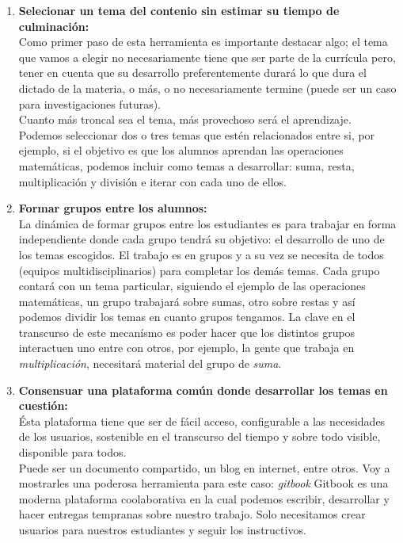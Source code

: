 \begin{enumerate}
 \item \textbf{Selecionar un tema del contenio sin estimar su tiempo de culminaci\'on:}\\
 Como primer paso de esta herramienta es importante destacar algo; el tema que vamos a elegir no necesariamente tiene que ser parte de la curr\'icula pero, tener 
 en cuenta que su desarrollo preferentemente durar\'a lo que dura el dictado de la materia, o m\'as, o no necesariamente termine (puede ser un caso para 
 investigaciones futuras).\\
 Cuanto m\'as troncal sea el tema, m\'as provechoso ser\'a el aprendizaje.\\ 
 Podemos seleccionar dos o tres temas que est\'en relacionados entre si, por ejemplo, si el objetivo es que los alumnos aprendan las operaciones matem\'aticas, 
 podemos incluir como temas a desarrollar: suma, resta, multiplicaci\'on y divisi\'on e iterar con cada uno de ellos.
 
 \item \textbf{Formar grupos entre los alumnos:}\\
 La din\'amica de formar grupos entre los estudiantes es para trabajar en forma independiente donde cada grupo tendr\'a su objetivo: el desarrollo de uno de los
 temas escogidos. El trabajo es en grupos y a su vez se necesita de todos (equipos multidisciplinarios) para completar los dem\'as temas. Cada grupo contar\'a 
 con un tema particular, siguiendo el ejemplo de las operaciones matem\'aticas, un grupo trabajar\'a sobre sumas, otro sobre restas y as\'i podemos dividir los 
 temas en cuanto grupos tengamos. La clave en el transcurso de este mecan\'ismo es poder hacer que los distintos grupos interactuen uno entre con otros, por 
 ejemplo, la gente que trabaja en \textit{multiplicaci\'on}, necesitar\'a material del grupo de \textit{suma}.
 
 \item \textbf{Consensuar una plataforma com\'un donde desarrollar los temas en cuesti\'on:}\\
 \'Esta plataforma tiene que ser de f\'acil acceso, configurable a las necesidades de los usuarios, sostenible en el transcurso del tiempo y sobre 
 todo visible, disponible para todos.\\
 Puede ser un documento compartido, un blog en internet, entre otros. Voy a mostrarles una poderosa herramienta para este caso: \emph{gitbook}\cite{gitbook}
 Gitbook es una moderna plataforma coolaborativa en la cual podemos escribir, desarrollar y hacer entregas tempranas sobre nuestro trabajo. Solo necesitamos 
 crear usuarios para nuestros estudiantes y seguir los instructivos.
 

\end{enumerate}
